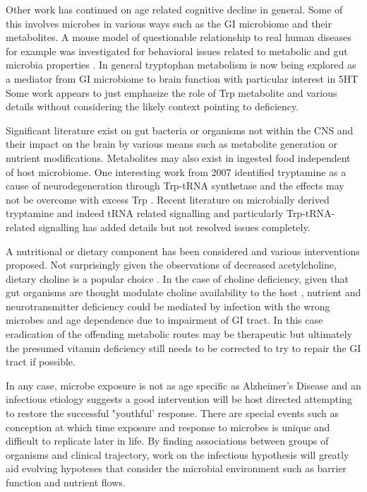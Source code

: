 \documentclass[aps,secnumarabic,balancelastpage,amsmath,amssymb,nofootinbib]{revtex4}
\begin{document}
Other work has continued on age related cognitive decline in general.
Some of this involves microbes in various ways such as the
GI microbiome and their metabolites.  A mouse model of
questionable relationship to real human diseases for example
was investigated for behavioral issues related to metabolic
and gut microbia properties \cite{PMID37717663}.
In general tryptophan metabolism is now being explored as
a mediator from GI microbiome to brain function
\cite{PMC7231603} with particular interest in 5HT
\cite{PMID25078296}
Some work appears to just emphasize the role of Trp
metabolite and various details
\cite{Savonije_Weaver_Role_Tryptophan_2023}
without considering the likely context pointing to deficiency.

Significant literature exist on gut bacteria or organisms
not within the CNS and their impact on the brain by various
means such as metabolite generation or nutrient modifications.
Metabolites may also exist in ingested food independent of host
microbiome. One interesting work from 2007 identified tryptamine
as a cause of neurodegeneration through Trp-tRNA synthetase 
and the effects may not be overcome with excess Trp
\cite{PMID17114825}. Recent literature on microbially derived
tryptamine and indeed tRNA related signalling and 
particularly Trp-tRNA- related signalling has added details but not
resolved issues completely. 

A nutritional or dietary component has been considered and various
interventions proposed.
Not surprisingly given the observations of decreased
acetylcholine, dietary choline is a popular choice
\cite{PMC7041773}. 
In the case of choline deficiency, given that gut organisms
are thought modulate choline availability to the host
\cite{MartinJBlaser_Intestinal_Microbiota_Composition_Modulates_2015}
, nutrient and neurotransmitter deficiency could be mediated by
infection with the wrong microbes and age dependence due
to impairment of GI tract. In this case eradication of the
offending metabolic routes may be therapeutic but ultimately
the presumed vitamin deficiency still needs to be corrected
to try to repair the GI tract if possible.  



In any case, microbe exposure is not as  age specific
as Alzheimer's Disease and an infectious etiology 
 suggests a good intervention
will be host directed attempting to restore the successful
"youthful' response. 
There are special events such as conception at which
time exposure and response to microbes is unique and difficult
to replicate later in life.
By finding  associations between groups of organisms
and clinical trajectory, work on the infectious hypothesis
will greatly aid evolving hypoteses that consider the
microbial environment such as barrier function and nutrient flows. 
\end{document}
